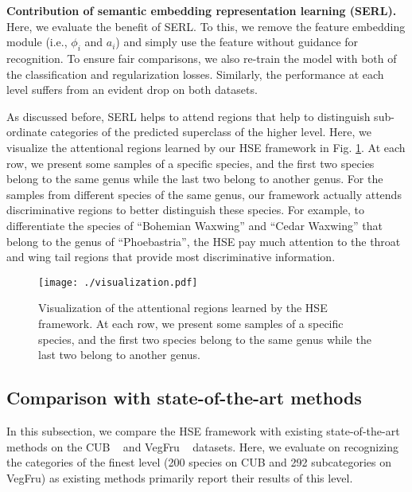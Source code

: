 \documentclass[sigconf]{acmart}
\begin{document}
\noindent\textbf{Contribution of semantic embedding representation learning (SERL). }Here, we evaluate the benefit of SERL. To this, we remove the feature embedding module (i.e., $\phi_i$ and $a_i$) and simply use the feature without guidance for recognition. To ensure fair comparisons, we also re-train the model with both of the classification and regularization losses. Similarly, the performance at each level suffers from an evident drop on both datasets.

As discussed before, SERL helps to attend regions that help to distinguish sub-ordinate categories of the predicted superclass of the higher level. Here, we visualize the attentional regions learned by our HSE framework in Fig. \ref{fig:vis}. At each row, we present some samples of a specific species, and the first two species belong to the same genus while the last two belong to another genus. For the samples from different species of the same genus, our framework actually attends discriminative regions to better distinguish these species. For example, to differentiate the species of ``Bohemian Waxwing'' and ``Cedar Waxwing'' that belong to the genus of ``Phoebastria'', the HSE pay much attention to the throat and wing tail regions that provide most discriminative information.

\begin{figure}[!t]
   \centering
   \texttt{[image: ./visualization.pdf]} %
   \caption{Visualization of the attentional regions learned by the HSE framework. At each row, we present some samples of a specific species, and the first two species belong to the same genus while the last two belong to another genus.}
   \label{fig:vis}
\end{figure} 


\subsection{Comparison with state-of-the-art methods}
In this subsection, we compare the HSE framework with existing state-of-the-art methods on the CUB ~\cite{wah2011caltech} and VegFru ~\cite{hou2017vegfru} datasets. Here, we evaluate on recognizing the categories of the finest level (200 species on CUB and 292 subcategories on VegFru) as existing methods primarily report their results of this level.
\end{document}

